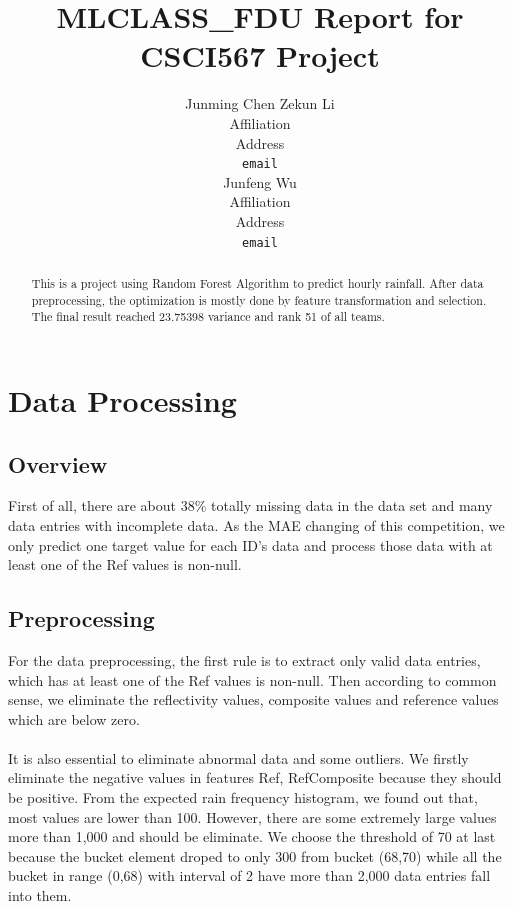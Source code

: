 \documentclass{article} %
\title{MLCLASS\_FDU Report for CSCI567 Project}
\author{
Junming Chen
\And
Zekun Li \\
Affiliation \\
Address \\
\texttt{email} \\
\AND
Junfeng Wu \\
Affiliation \\
Address \\
\texttt{email}
}
\begin{document}
\maketitle

\begin{abstract}
This is a project using Random Forest Algorithm to predict hourly rainfall. After data preprocessing, the optimization is mostly done by feature transformation and selection. The final result reached 23.75398 variance and rank 51 of all teams.
\end{abstract}

\section{Data Processing}

\subsection{Overview}
First of all, there are about 38\% totally missing data in the data set and many data entries with incomplete data. As the MAE changing of this competition, we only predict one target value for each ID's data and process those data with at least one of the Ref values is non-null.

\subsection{Preprocessing}

For the data preprocessing, the first rule is to extract only valid data entries, which has at least one of the Ref values is non-null. Then according to common sense, we eliminate the reflectivity values, composite values and reference values which are below zero. \\
\\
It is also essential to eliminate abnormal data and some outliers. We firstly eliminate the negative values in features Ref, RefComposite because they should be positive. From the expected rain frequency histogram, we found out that, most values are lower than 100. However, there are some extremely large values more than 1,000 and should be eliminate. We choose the threshold of 70 at last because the bucket element droped to only 300 from bucket (68,70) while all the bucket in range (0,68) with interval of 2 have more than 2,000 data entries fall into them.\\
\end{document}
